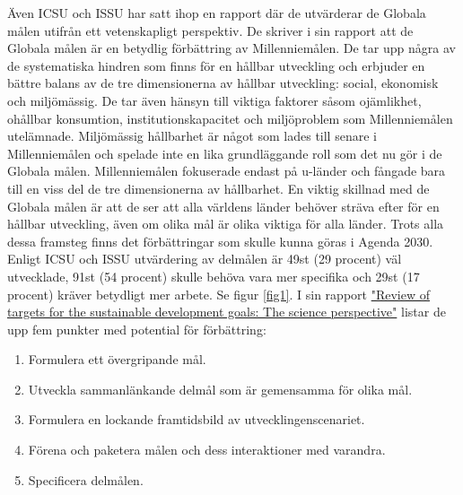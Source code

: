 \documentclass{report}
\begin{document}
Även ICSU och ISSU har satt ihop en rapport där de utvärderar de Globala målen utifrån ett vetenskapligt perspektiv. De skriver i sin rapport att de Globala målen är en betydlig förbättring av Millenniemålen.  De tar upp några av de systematiska hindren som finns för en hållbar utveckling och erbjuder en bättre balans av de tre dimensionerna av hållbar utveckling: social, ekonomisk och miljömässig. De tar även hänsyn till viktiga faktorer såsom ojämlikhet, ohållbar konsumtion, institutionskapacitet och miljöproblem som Millenniemålen utelämnade. Miljömässig hållbarhet är något som lades till senare i Millenniemålen och spelade inte en lika grundläggande roll som det nu gör i de Globala målen. Millenniemålen fokuserade endast på u-länder och fångade bara till en viss del de tre dimensionerna av hållbarhet. En viktig skillnad med de Globala målen är att de ser att alla världens länder behöver sträva efter för en hållbar utveckling, även om olika mål är olika viktiga för alla länder. Trots alla dessa framsteg finns det förbättringar som skulle kunna göras i Agenda 2030. Enligt ICSU och ISSU utvärdering av delmålen är 49st (29 procent) väl utvecklade, 91st (54 procent) skulle behöva vara mer specifika och 29st (17 procent) kräver betydligt mer arbete. Se figur \ref{fig1}. 
I sin rapport \href{http://www.icsu.org/publications/reports-and-reviews/review-of-targets-for-the-sustainable-development-goals-the-science-perspective-2015/SDG-Report.pdf}{"Review of targets for the sustainable development goals: The science perspective"} listar de upp fem punkter med potential för förbättring:  

\begin{enumerate} \label{forbattring}
\item Formulera ett övergripande mål.
\label{improvment1}
\item Utveckla sammanlänkande delmål som är gemensamma för olika mål. 
\label{improvment2}
 \item Formulera en lockande framtidsbild av utvecklingenscenariet.
 \label{improvment3} 
\item Förena och paketera målen och dess interaktioner med varandra. \label{improvment4}
\item Specificera delmålen.
\label{improvment5} \cite{review}
\end{enumerate} \\
\end{document}
